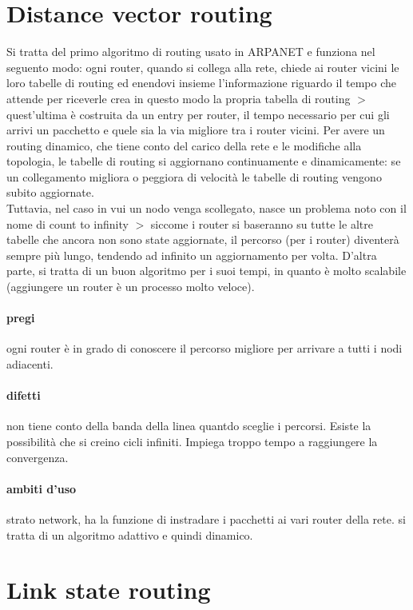 \documentclass{article}
\begin{document}
\section{Distance vector routing}

Si tratta del primo algoritmo di routing usato in ARPANET e funziona nel
seguento modo: ogni router, quando si collega alla rete, chiede ai router vicini
le loro tabelle di routing ed enendovi insieme l'informazione riguardo il tempo
che attende per riceverle crea in questo modo la propria tabella di routing $>$
quest'ultima è costruita da un entry per router, il tempo necessario per cui gli
arrivi un pacchetto e quele sia la via migliore tra i router vicini. Per avere
un routing dinamico, che tiene conto del carico della rete e le modifiche alla
topologia, le tabelle di routing si aggiornano continuamente e dinamicamente: se
un collegamento migliora o peggiora di velocità le tabelle di routing vengono
subito aggiornate.\\
Tuttavia, nel caso in vui un nodo venga scollegato, nasce un problema noto con
il nome di count to infinity $>$ siccome i router si baseranno su tutte le altre
tabelle che ancora non sono state aggiornate, il percorso (per i router)
diventerà sempre più lungo, tendendo ad infinito un aggiornamento per volta.
D'altra parte, si tratta di un buon algoritmo per i suoi tempi, in quanto è
molto scalabile (aggiungere un router è un processo molto veloce).

\paragraph{pregi} ogni router è in grado di conoscere il percorso migliore per
arrivare a tutti i nodi adiacenti.

\paragraph{difetti} non tiene conto della banda della linea quantdo sceglie i
percorsi. Esiste la possibilità che si creino cicli infiniti. Impiega troppo
tempo a raggiungere la convergenza.

\paragraph{ambiti d'uso} strato network, ha la funzione di instradare i
pacchetti ai vari router della rete. si tratta di un algoritmo adattivo e quindi
dinamico.

\section{Link state routing}
\end{document}
